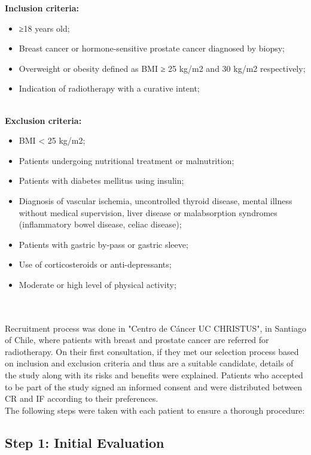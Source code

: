 \documentclass[journal,article,submit,pdftex,moreauthors]{Definitions/mdpi}
\begin{document}
\textbf{Inclusion criteria:}
\begin{itemize}
\item	≥18 years old;
\item	Breast cancer or hormone-sensitive prostate cancer diagnosed by biopsy;
\item	Overweight or obesity defined as BMI ≥ 25 kg/m2 and 30 kg/m2 respectively;
\item	Indication of radiotherapy with a curative intent;
\end{itemize}\\
\hfill\break
\textbf{Exclusion criteria:}
\begin{itemize}
\item	BMI < 25 kg/m2;
\item	Patients undergoing nutritional treatment or malnutrition;
\item	Patients with diabetes mellitus using insulin;
\item	Diagnosis of vascular ischemia, uncontrolled thyroid disease, mental illness without medical supervision, liver disease or malabsorption syndromes (inflammatory bowel disease, celiac disease);
\item	Patients with gastric by-pass or gastric sleeve;
\item	Use of corticosteroids or anti-depressants;
\item	Moderate or high level of physical activity;
\end{itemize}
\\
\\

{\color{blue}Recruitment process was done in "Centro de Cáncer UC CHRISTUS", in Santiago of Chile, where patients with breast and prostate cancer are referred for radiotherapy. On their first consultation, if they met our selection process based on inclusion and exclusion criteria and thus are a suitable candidate}, details of the study along with its risks and benefits were explained. Patients who accepted to be part of the study signed an informed consent and were distributed between CR and IF according to their preferences.\\

The following steps were taken with each patient to ensure a thorough procedure:\\

\subsection{Step 1: Initial Evaluation}
\end{document}
